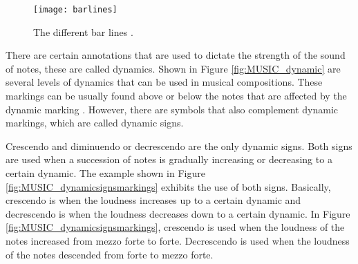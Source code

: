 \begin{figure}[H]
	\centering
	\texttt{[image: barlines]}
    \caption{The different bar lines \citep{dummy2017barlines}.} 
    \label{fig:MUSIC_barlines}
\end{figure}

There are certain annotations that are used to dictate the strength of the sound of notes, these are called dynamics. Shown in Figure \ref{fig:MUSIC_dynamic} are several levels of dynamics that can be used in musical compositions. These markings can be usually found above or below the notes that are affected by the dynamic marking \citep{read1969music}. However, there are symbols that also complement dynamic markings, which are called dynamic signs. 

Crescendo and diminuendo or decrescendo are the only dynamic signs. Both signs are used when a succession of notes is gradually increasing or decreasing to a certain dynamic. The example shown in Figure \ref{fig:MUSIC_dynamicsignsmarkings} exhibits the use of both signs. Basically, crescendo is when the loudness increases up to a certain dynamic and decrescendo is when the loudness decreases down to a certain dynamic. In Figure \ref{fig:MUSIC_dynamicsignsmarkings}, crescendo is used when the loudness of the notes increased from mezzo forte to forte. Decrescendo is used when the loudness of the notes descended from forte to mezzo forte.

    
